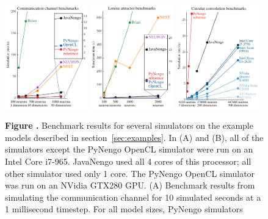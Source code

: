 \documentclass{frontiersSCNS}
\begin{document}
\begin{figure}
\begin{center}
  \includegraphics[width=0.32\textwidth]{bench_cchannel}
  \includegraphics[width=0.32\textwidth]{bench_lorenz}
  \includegraphics[width=0.32\textwidth]{bench_cconv}
\end{center}
 \textbf{
     \label{fig:benchmarks}
     Figure .}{
     Benchmark results for several simulators
     on the example models described
     in section~\ref{sec:examples}.
     In (A) and (B), all of the simulators
     except the PyNengo OpenCL simulator
     were run on an Intel Core i7-965.
     JavaNengo used all 4 cores of this processor;
     all other simulator used only 1 core.
     The PyNengo OpenCL simulator
     was run on an NVidia GTX280 GPU.
     (A) Benchmark results from simulating
     the communication channel for 10 simulated seconds
     at a 1 millisecond timestep.
     For all model sizes, PyNengo simulators
}
\end{figure}
\end{document}
